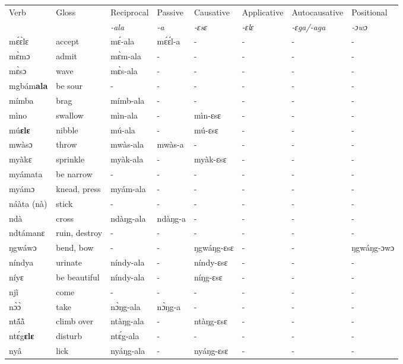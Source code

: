 \begin{sidewaystable}
\begin{tabular}{llllllll}
 \lsptoprule
 Verb & Gloss & Reciprocal & Passive  & Causative  & Applicative   & Autocausative & Positional   \\
  &    & {\itshape -ala} & {\itshape -a} & {\itshape -ɛsɛ} & {\itshape -ɛlɛ} & {\itshape -ɛga/-aga}  & {\itshape -ɔwɔ}  \\
\midrule
mɛ́ɛ̀lɛ & accept & mɛ́-ala & mɛ́ɛ́l-a & - & - & - & - \\
mɛ̀mɔ & admit & mɛ̀m-ala & - & - & -  & - & - \\
mɛ̀sɔ & wave & mɛ̀s-ala & - & - & -  & - & - \\
mgbám{\bfseries ala} & be sour & - & - & - &  - & - & - \\
mímba & brag & mímb-ala & - & - & - & - & - \\
mìno & swallow & mìn-ala & - & mìn-ɛsɛ & - &  - & - \\
mú{\bfseries ɛlɛ} & nibble & mú-ala & - & mú-ɛsɛ & - & - & - \\
mwàsɔ & throw & mwàs-ala & mwàs-a & - & - & - & - \\
myàkɛ & sprinkle & myàk-ala & - & myàk-ɛsɛ & - &  - & - \\
myámata & be narrow & - & - & - & - & - & - \\
myámɔ & knead, press & myám-ala & - & - & - & - & - \\
náàta (nà) & stick & - & - & - & - & - & - \\
ndà & cross & ndàŋg-ala & ndàŋg-a & - &  - & - & - \\
ndtámanɛ & ruin, destroy & - & - & - & - & - & - \\
ŋgwáwɔ & bend, bow & - & - & ŋgwáŋg-ɛsɛ & - & - & ŋgwáŋg-ɔwɔ \\  
níndya & urinate & níndy-ala & - & níndy-ɛsɛ & - &  - & - \\
níyɛ & be beautiful & níndy-ala & - & níŋg-ɛsɛ & - &  - & - \\
njì & come & - & - & - & - & - & - \\
nɔ̀ɔ̀ & take & nɔ̀ŋg-ala & nɔ̀ŋg-a & - & - & - & - \\
ntã́ã̀ & climb over & ntàŋg-ala & - & ntàŋg-ɛsɛ & - &  - & - \\
ntɛ́g{\bfseries ɛlɛ} & disturb & ntɛ́g-ala & - & - & - & - & - \\
nyâ & lick & nyáŋg-ala & - & nyáŋg-ɛsɛ & - &  - & - \\
\midrule\end{tabular}\end{sidewaystable}

